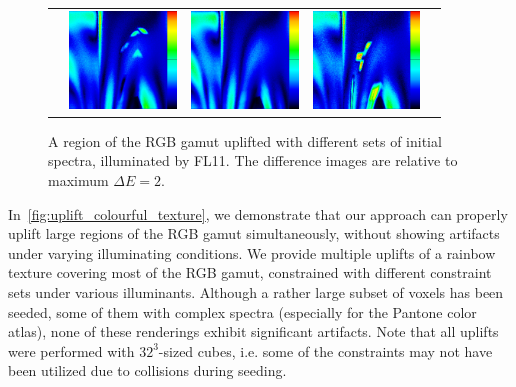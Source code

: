 \begin{figure}[t]
{\begin{tabular}{ccccc}
			& \quad
			\includegraphics[width=.20\linewidth, height=7em]{img/gradient_diff_mbc.png}
			& \quad
			\includegraphics[width=.20\linewidth, height=7em]{img/gradient_diff_middle.png}
			& \quad
			\includegraphics[width=.20\linewidth, height=7em]{img/gradient_diff_pantone.png}\\
		\end{tabular}
	}
	\caption{A region of the RGB gamut uplifted with different sets of initial spectra, illuminated by FL11. The difference images are relative to maximum $\Delta E = 2$.}
	\label{fig:colorimetric_properties}
	\vspace{-1em}
\end{figure}

In~\cref{fig:uplift_colourful_texture}, we demonstrate that our approach can properly uplift large regions of the RGB gamut simultaneously, without showing artifacts under varying illuminating conditions. We provide multiple uplifts of a rainbow texture covering most of the RGB gamut, constrained with different constraint sets under various illuminants. Although a rather large subset of voxels has been seeded, some of them with complex spectra (especially for the Pantone color atlas), none of these renderings exhibit significant artifacts. Note that all uplifts were performed with $32^3$-sized cubes, i.e. some of the constraints may not have been utilized due to collisions during seeding.

